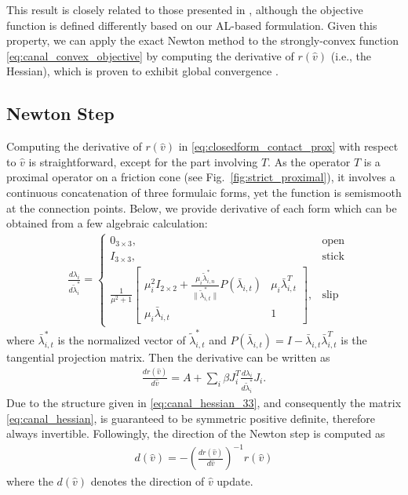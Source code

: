 \documentclass[lettersize,journal]{IEEEtran}
\begin{document}
This result is closely related to those presented in \cite{todorov2014convex, castro2022unconstrained}, although the objective function is defined differently based on our AL-based formulation. 
Given this property, we can apply the exact Newton method to the strongly-convex function \eqref{eq:canal_convex_objective} by computing the derivative of $r(\hat{v})$ (i.e., the Hessian), which is proven to exhibit global convergence \cite{nocedal1999numerical}.


\subsection{Newton Step}

Computing the derivative of $r(\hat{v})$ in \eqref{eq:closedform_contact_prox} with respect to $\hat{v}$ is straightforward, except for the part involving $T$.  
As the operator $T$ is a proximal operator on a friction cone (see Fig.~\ref{fig:strict_proximal}), it involves a continuous concatenation of three formulaic forms, yet the function is semismooth at the connection points. 
Below, we provide derivative of each form which can be obtained from a few algebraic calculation:
\begin{align} \label{eq:canal_hessian_33}
    &\frac{d\lambda_i}{d\tilde{\lambda}_i^*} = 
    \begin{cases}
        0_{3\times 3}, & \mbox{open} \\
        I_{3\times 3}, & \mbox{stick} \\
        \frac{1}{\mu^2+1}
        \begin{bmatrix}
            \mu_i^2 I_{2\times 2} + \frac{\mu_i\tilde{\lambda}_{i,n}^*}{\|\tilde{\lambda}_{i,t}^*\|}P(\bar{\lambda}_{i,t})  & \mu_i\bar{\lambda}_{i,t}^T  \\
            \mu_i\bar{\lambda}_{i,t} & 1
        \end{bmatrix}, & \mbox{slip}
    \end{cases}
\end{align}
where $\bar{\lambda}_{i,t}^*$ is the normalized vector of $\tilde{\lambda}_{i,t}^*$ and $P(\bar{\lambda}_{i,t}) = I - \bar{\lambda}_{i,t}\bar{\lambda}_{i,t}^T$ is the tangential projection matrix.
Then the derivative can be written as
\begin{align} \label{eq:canal_hessian}
    \frac{dr(\hat{v})}{d\hat{v}} = A + \sum_i \beta J_i^T\frac{d\lambda_i}{d\tilde{\lambda}_i^*} J_i.
\end{align}
Due to the structure given in \eqref{eq:canal_hessian_33}, and consequently the matrix \eqref{eq:canal_hessian}, is guaranteed to be symmetric positive definite, therefore always invertible.
Followingly, the direction of the Newton step is computed as
\begin{align} \label{eq:canal_newtonstep}
    d(\hat{v}) = -\left(\frac{dr(\hat{v})}{d\hat{v}}\right)^{-1} r(\hat{v})    
\end{align}
where the $d(\hat{v})$ denotes the direction of $\hat{v}$ update.
\end{document}
